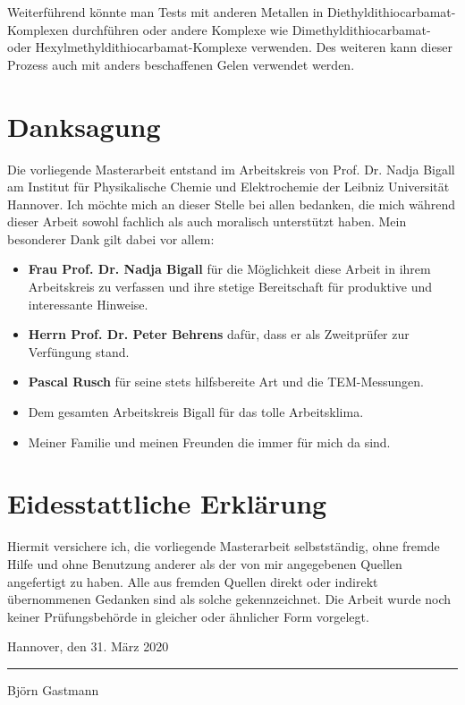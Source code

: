 Weiterführend könnte man Tests mit anderen Metallen in Diethyldithiocarbamat-Komplexen durchführen oder andere Komplexe wie Dimethyldithiocarbamat- oder Hexylmethyldithiocarbamat-Komplexe verwenden.
Des weiteren kann dieser Prozess auch mit anders beschaffenen Gelen verwendet werden.


\chapter*{Danksagung}

Die vorliegende Masterarbeit entstand im Arbeitskreis von Prof. Dr. Nadja Bigall am Institut für Physikalische Chemie und Elektrochemie der Leibniz Universität Hannover. Ich möchte mich an dieser Stelle bei allen bedanken, die mich während dieser Arbeit sowohl fachlich als auch moralisch unterstützt haben. Mein besonderer Dank gilt
dabei vor allem:

\begin{itemize}
	\item \textbf{Frau Prof. Dr. Nadja Bigall} für die Möglichkeit diese Arbeit in ihrem Arbeitskreis zu verfassen und ihre stetige Bereitschaft für produktive und interessante Hinweise.
	\item \textbf{Herrn Prof. Dr. Peter Behrens} dafür, dass er als Zweitprüfer zur Verfüngung stand.
	\item \textbf{Pascal Rusch} für seine stets hilfsbereite Art und die TEM-Messungen.
	\item Dem gesamten Arbeitskreis Bigall für das tolle Arbeitsklima.
	\item Meiner Familie und meinen Freunden die immer für mich da sind.
	
\end{itemize}

\pagebreak

\chapter*{Eidesstattliche Erklärung}

Hiermit versichere ich, die vorliegende Masterarbeit selbstständig, ohne
fremde Hilfe und ohne Benutzung anderer als der von mir angegebenen Quellen
angefertigt zu haben. Alle aus fremden Quellen direkt oder indirekt übernommenen
Gedanken sind als solche gekennzeichnet. Die Arbeit wurde noch
keiner Prüfungsbehörde in gleicher oder ähnlicher Form vorgelegt.

\vspace{5cm}

\noindent Hannover, den 31. März 2020
\vspace{2cm}
\hrule
\vspace{5mm}
\noindent Björn Gastmann